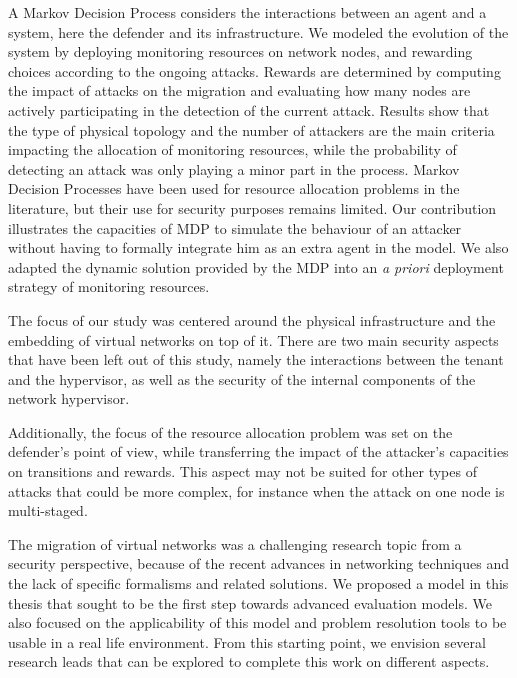 A Markov Decision Process considers the interactions between an agent and a system, here the defender and its infrastructure. We modeled the evolution of the system by deploying monitoring resources on network nodes, and rewarding choices according to the ongoing attacks.
Rewards are determined by computing the impact of attacks on the migration and evaluating how many nodes are actively participating in the detection of the current attack.
Results show that the type of physical topology and the number of attackers are the main criteria impacting the allocation of monitoring resources, while the probability of detecting an attack was only playing a minor part in the process. 
Markov Decision Processes have been used for resource allocation problems in the literature, but their use for security purposes remains limited. Our contribution illustrates the capacities of MDP to simulate the behaviour of an attacker without having to formally integrate him as an extra agent in the model.
We also adapted the dynamic solution provided by the MDP into an \textit{a priori} deployment strategy of monitoring resources.

The focus of our study was centered around the physical infrastructure and the embedding of virtual networks on top of it.
There are two main security aspects that have been left out of this study, namely the interactions between the tenant and the hypervisor, as well as the security of the internal components of the network hypervisor.

Additionally, the focus of the resource allocation problem was set on the defender's point of view, while transferring the impact of the attacker's capacities on transitions and rewards. This aspect may not be suited for other types of attacks that could be more complex, for instance when the attack on one node is multi-staged.

The migration of virtual networks was a challenging research topic from a security perspective, because of the recent advances in networking techniques and the lack of specific formalisms and related solutions. We proposed a model in this thesis that sought to be the first step towards advanced evaluation models. We also focused on the applicability of this model and problem resolution tools to be usable in a real life environment. From this starting point, we envision several research leads that can be explored to complete this work on different aspects.

